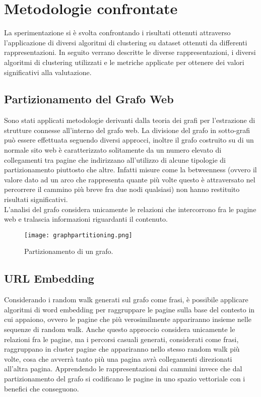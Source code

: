 \section{Metodologie confrontate}
La sperimentazione si è svolta confrontando i risultati ottenuti attraverso l'applicazione di diversi algoritmi di clustering su dataset ottenuti da differenti rappresentazioni. In seguito verrano descritte le diverse rappresentazioni, i diversi algoritmi di clustering utilizzati e le metriche applicate per ottenere dei valori significativi alla valutazione.
\subsection{Partizionamento del Grafo Web}
Sono stati applicati metodologie derivanti dalla teoria dei grafi per l'estrazione di strutture connesse all'interno del grafo web. La divisione del grafo in sotto-grafi può essere effettuata seguendo diversi approcci, inoltre il grafo costruito su di un normale sito web è caratterizzato solitamente da un numero elevato di collegamenti tra pagine che indirizzano all'utilizzo di alcune tipologie di partizionamento piuttosto che altre. Infatti misure come la betweenness (ovvero il valore dato ad un arco che rappresenta quante più volte questo è attraversato nel percorrere il cammino più breve fra due nodi qualsiasi) non hanno restituito risultati significativi.
\\
L'analisi del grafo considera unicamente le relazioni che intercorrono fra le pagine web e tralascia informazioni riguardanti il contenuto.
\begin{figure}[htb]
	\centering
	\texttt{[image: graphpartitioning.png]}
	\caption{Partizionamento di un grafo.}
	\label{modularity}
\end{figure}

\subsection{URL Embedding}
Considerando i random walk generati sul grafo come frasi, è possibile applicare algoritmi di word embedding per raggruppare le pagine sulla base del contesto in cui appaiono, ovvero le pagine che più verosimilmente appariranno insieme nelle sequenze di random walk. Anche questo approccio considera unicamente le relazioni fra le pagine, ma i percorsi casuali generati, considerati come frasi, raggruppano in cluster pagine che appariranno nello stesso random walk più volte, cosa che avverrà tanto più una pagina avrà collegamenti direzionati all'altra pagina. Apprendendo le rappresentazioni dai cammini invece che dal partizionamento del grafo si codificano le pagine in uno spazio vettoriale con i benefici che conseguono.

